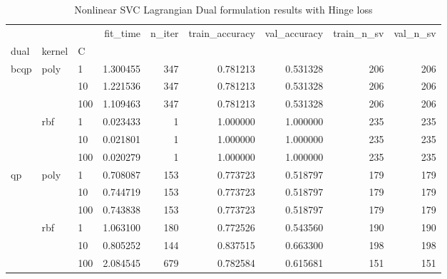 \begin{table}[H]
\centering
\caption{Nonlinear SVC Lagrangian Dual formulation results with Hinge loss}
\label{nonlinear_lagrangian_dual_svc_cv_results}
\begin{tabular}{lllrrrrrr}
\toprule
   &     &     &  fit\_time &  n\_iter &  train\_accuracy &  val\_accuracy &  train\_n\_sv &  val\_n\_sv \\
dual & kernel & C &           &         &                 &               &             &           \\
\midrule
bcqp & poly & 1   &  1.300455 &     347 &        0.781213 &      0.531328 &         206 &       206 \\
   &     & 10  &  1.221536 &     347 &        0.781213 &      0.531328 &         206 &       206 \\
   &     & 100 &  1.109463 &     347 &        0.781213 &      0.531328 &         206 &       206 \\
   & rbf & 1   &  0.023433 &       1 &        1.000000 &      1.000000 &         235 &       235 \\
   &     & 10  &  0.021801 &       1 &        1.000000 &      1.000000 &         235 &       235 \\
   &     & 100 &  0.020279 &       1 &        1.000000 &      1.000000 &         235 &       235 \\
qp & poly & 1   &  0.708087 &     153 &        0.773723 &      0.518797 &         179 &       179 \\
   &     & 10  &  0.744719 &     153 &        0.773723 &      0.518797 &         179 &       179 \\
   &     & 100 &  0.743838 &     153 &        0.773723 &      0.518797 &         179 &       179 \\
   & rbf & 1   &  1.063100 &     180 &        0.772526 &      0.543560 &         190 &       190 \\
   &     & 10  &  0.805252 &     144 &        0.837515 &      0.663300 &         198 &       198 \\
   &     & 100 &  2.084545 &     679 &        0.782584 &      0.615681 &         151 &       151 \\
\bottomrule
\end{tabular}
\end{table}
